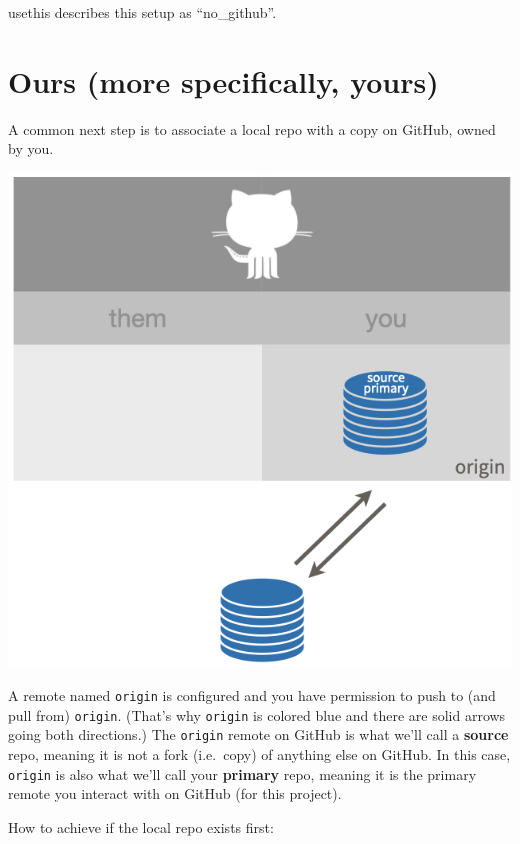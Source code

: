 \documentclass[
]{book}
\begin{document}
usethis describes this setup as ``no\_github''.

\section{Ours (more specifically, yours)}\label{ours-you}

A common next step is to associate a local repo with a copy on GitHub, owned by you.

\begin{center}\includegraphics[width=0.6\linewidth]{img/ours-you} \end{center}

A remote named \texttt{origin} is configured and you have permission to push to (and pull from) \texttt{origin}.
(That's why \texttt{origin} is colored blue and there are solid arrows going both directions.)
The \texttt{origin} remote on GitHub is what we'll call a \textbf{source} repo, meaning it is not a fork (i.e.~copy) of anything else on GitHub.
In this case, \texttt{origin} is also what we'll call your \textbf{primary} repo, meaning it is the primary remote you interact with on GitHub (for this project).

How to achieve if the local repo exists first:
\end{document}
